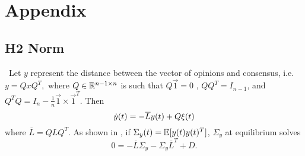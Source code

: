 \documentclass{article}
\begin{document}
\section*{Appendix}
\subsection*{H2 Norm } 

\ Let $y$ represent the distance between the vector of opinions and consensus, i.e.
$y=QxQ^T,$
where $Q\in{\mathbb{R}}^{n-1\times n}$ is such that $Q\vec{1}=0$ , $QQ^T=I_{n-1}$, and $Q^TQ=I_n-\frac{1}{n}\vec{1}\times\vec{1}^T$.   
Then 
\begin{equation}
\dot{y}(t)=-\overline{L}y(t)+Q\xi(t) \notag
\end{equation}
where $\overline{L}=QLQ^T$.  As shown in \cite{Young:2010fk}, if $\Sigma_y(t)={\mathbb{E}}[y(t)y(t)^T]$,  $\Sigma_y$ at equilibrium solves
\begin{equation} 0=-\overline{L}\Sigma_y-\Sigma_y\overline{L}^T+D. \label{h2norm}
\end{equation}

\nocite{*}


\end{document}
